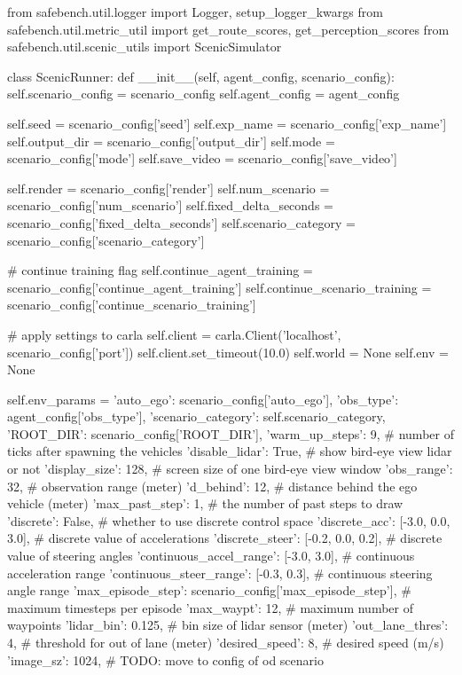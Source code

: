 \begin{appendix}
from safebench.util.logger import Logger, setup\_logger\_kwargs
from safebench.util.metric\_util import get\_route\_scores, get\_perception\_scores
from safebench.util.scenic\_utils import ScenicSimulator

class ScenicRunner:
def \_\_init\_\_(self, agent\_config, scenario\_config):
self.scenario\_config = scenario\_config
self.agent\_config = agent\_config

self.seed = scenario\_config['seed']
self.exp\_name = scenario\_config['exp\_name']
self.output\_dir = scenario\_config['output\_dir']
self.mode = scenario\_config['mode']
self.save\_video = scenario\_config['save\_video']

self.render = scenario\_config['render']
self.num\_scenario = scenario\_config['num\_scenario']
self.fixed\_delta\_seconds = scenario\_config['fixed\_delta\_seconds']
self.scenario\_category = scenario\_config['scenario\_category']

\# continue training flag
self.continue\_agent\_training = scenario\_config['continue\_agent\_training']
self.continue\_scenario\_training = scenario\_config['continue\_scenario\_training']

\# apply settings to carla
self.client = carla.Client('localhost', scenario\_config['port'])
self.client.set\_timeout(10.0)
self.world = None
self.env = None

self.env\_params = {
	'auto\_ego': scenario\_config['auto\_ego'],
	'obs\_type': agent\_config['obs\_type'],
	'scenario\_category': self.scenario\_category,
	'ROOT\_DIR': scenario\_config['ROOT\_DIR'],
	'warm\_up\_steps': 9,                                        \# number of ticks after spawning the vehicles
	'disable\_lidar': True,                                     \# show bird-eye view lidar or not
	'display\_size': 128,                                       \# screen size of one bird-eye view window
	'obs\_range': 32,                                           \# observation range (meter)
	'd\_behind': 12,                                            \# distance behind the ego vehicle (meter)
	'max\_past\_step': 1,                                        \# the number of past steps to draw
	'discrete': False,                                         \# whether to use discrete control space
	'discrete\_acc': [-3.0, 0.0, 3.0],                          \# discrete value of accelerations
	'discrete\_steer': [-0.2, 0.0, 0.2],                        \# discrete value of steering angles
	'continuous\_accel\_range': [-3.0, 3.0],                     \# continuous acceleration range
	'continuous\_steer\_range': [-0.3, 0.3],                     \# continuous steering angle range
	'max\_episode\_step': scenario\_config['max\_episode\_step'],   \# maximum timesteps per episode
	'max\_waypt': 12,                                           \# maximum number of waypoints
	'lidar\_bin': 0.125,                                        \# bin size of lidar sensor (meter)
	'out\_lane\_thres': 4,                                       \# threshold for out of lane (meter)
	'desired\_speed': 8,                                        \# desired speed (m/s)
	'image\_sz': 1024,                                          \# TODO: move to config of od scenario
}



\end{appendix}
